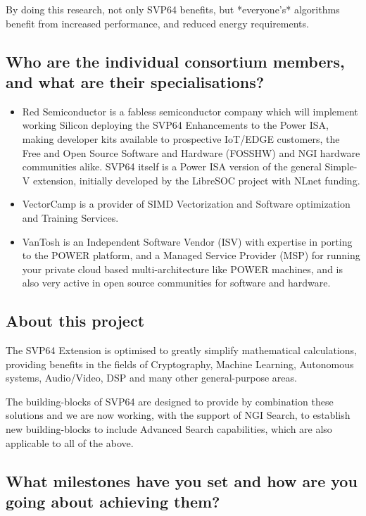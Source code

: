By doing this research, not only SVP64 benefits, but *everyone's* algorithms
benefit from increased performance, and reduced energy requirements.

\subsection{Who are the individual consortium members, and what are their specialisations?}

\begin{itemize}
  \item Red Semiconductor is a fabless semiconductor company which will implement
  working Silicon deploying the SVP64 Enhancements to the Power ISA, making
  developer kits available to prospective IoT/EDGE customers, the Free and
  Open Source Software and Hardware (FOSSHW) and NGI hardware communities
  alike. SVP64 itself is a Power ISA version of the general Simple-V
  extension, initially developed by the LibreSOC project with NLnet funding.
  \item VectorCamp is a provider of SIMD Vectorization and Software optimization
  and Training Services.
  \item VanTosh is an Independent Software Vendor (ISV) with expertise in porting
  to the POWER platform, and a Managed Service Provider (MSP) for running
  your private cloud based multi-architecture like POWER machines, and is
  also very active in open source communities for software and hardware.
\end{itemize}

\subsection{About this project}

The SVP64 Extension is optimised to greatly simplify mathematical calculations,
providing benefits in the fields of Cryptography, Machine Learning,
Autonomous systems, Audio/Video, DSP and many other general-purpose areas.
 
The building-blocks of SVP64 are designed to provide by combination these
solutions and we are now working, with the support of NGI Search, to
establish new building-blocks to include Advanced Search capabilities,
which are also applicable to all of the above.

\subsection{What milestones have you set and how are you going about achieving them?}

